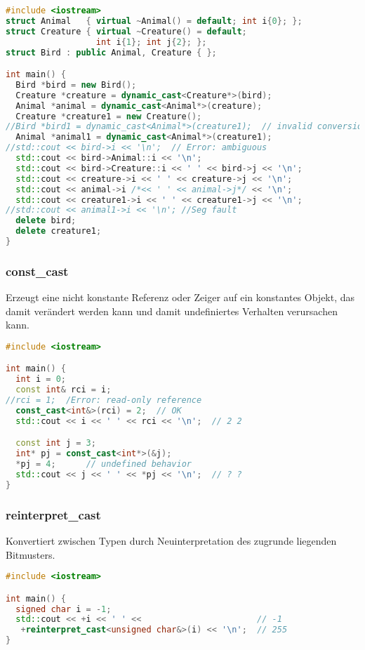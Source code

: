\begin{lstlisting}[language=C++]
#include <iostream>
struct Animal   { virtual ~Animal() = default; int i{0}; };
struct Creature { virtual ~Creature() = default;
                  int i{1}; int j{2}; };
struct Bird : public Animal, Creature { };

int main() {
  Bird *bird = new Bird();
  Creature *creature = dynamic_cast<Creature*>(bird);
  Animal *animal = dynamic_cast<Animal*>(creature);
  Creature *creature1 = new Creature();
//Bird *bird1 = dynamic_cast<Animal*>(creature1);  // invalid conversion
  Animal *animal1 = dynamic_cast<Animal*>(creature1);
//std::cout << bird->i << '\n';  // Error: ambiguous
  std::cout << bird->Animal::i << '\n';
  std::cout << bird->Creature::i << ' ' << bird->j << '\n';
  std::cout << creature->i << ' ' << creature->j << '\n';
  std::cout << animal->i /*<< ' ' << animal->j*/ << '\n';
  std::cout << creature1->i << ' ' << creature1->j << '\n';
//std::cout << animal1->i << '\n'; //Seg fault
  delete bird;
  delete creature1;
}
\end{lstlisting}

\subsubsection{const\_cast}
\label{sec:Conversion:constCast}

Erzeugt eine nicht konstante Referenz oder Zeiger auf ein konstantes Objekt, das
damit verändert werden kann und damit undefiniertes Verhalten verursachen kann.

\begin{lstlisting}[language=C++]
#include <iostream>

int main() {
  int i = 0;
  const int& rci = i;
//rci = 1;  /Error: read-only reference
  const_cast<int&>(rci) = 2;  // OK
  std::cout << i << ' ' << rci << '\n';  // 2 2

  const int j = 3;
  int* pj = const_cast<int*>(&j);
  *pj = 4;      // undefined behavior
  std::cout << j << ' ' << *pj << '\n';  // ? ?
}
\end{lstlisting}

\subsubsection{reinterpret\_cast}

Konvertiert zwischen Typen durch Neuinterpretation des zugrunde liegenden
Bitmusters.

\begin{lstlisting}[language=C++]
#include <iostream>

int main() {
  signed char i = -1;
  std::cout << +i << ' ' <<                       // -1
   +reinterpret_cast<unsigned char&>(i) << '\n';  // 255
}
\end{lstlisting}


